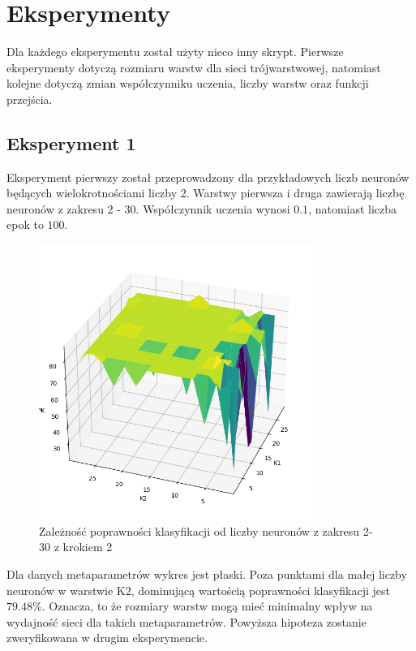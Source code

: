 \documentclass{article}
\begin{document}
\section{Eksperymenty}
Dla każdego eksperymentu został użyty nieco inny skrypt.
Pierwsze eksperymenty dotyczą rozmiaru warstw dla sieci trójwarstwowej, natomiast kolejne dotyczą zmian współczynniku uczenia, liczby warstw oraz funkcji przejścia.
\subsection{Eksperyment 1}

Eksperyment pierwszy został przeprowadzony dla przykładowych liczb neuronów będących wielokrotnościami liczby 2.
Warstwy pierwsza i druga zawierają liczbę neuronów z zakresu 2 - 30.
Współczynnik uczenia wynosi $0.1$, natomiast liczba epok to $100$.

\begin{figure}[H]
    \centering
    \includegraphics[width=0.8\textwidth, keepaspectratio]{k1_k2_1.png}
    \caption{Zależność poprawności klasyfikacji od liczby neuronów z zakresu 2-30 z krokiem 2}
    \label{fig:k1k2_1}
\end{figure}

Dla danych metaparametrów wykres jest płaski.
Poza punktami dla małej liczby neuronów w warstwie K2, dominującą wartością poprawności klasyfikacji jest $79.48\%$.
Oznacza, to że rozmiary warstw mogą mieć minimalny wpływ na wydajność sieci dla takich metaparametrów.
Powyższa hipoteza zostanie zweryfikowana w drugim eksperymencie.
\end{document}
